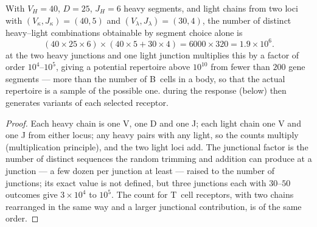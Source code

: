 \begin{theorem}\label{thm:b3:adaptive-immunity:repertoire}
With $V_{H} = 40$, $D = 25$, $J_{H} = 6$ heavy segments, and light chains
from two loci with $(V_{\kappa}, J_{\kappa}) = (40, 5)$ and
$(V_{\lambda}, J_{\lambda}) = (30, 4)$, the number of distinct
heavy--light combinations obtainable by segment choice alone is
\[
(40\times 25\times 6)\times(40\times 5 + 30\times 4) = 6000\times 320
= 1.9\times 10^{6}.
\]
 at the two heavy junctions and one light junction
multiplies this by a factor of order $10^{4}$--$10^{5}$, giving a
potential repertoire above $10^{10}$ from fewer than $200$ gene
segments --- more than the number of B~cells in a body, so that the
actual repertoire is a sample of the possible one.  during the response (below) then generates variants of
each selected receptor.
\end{theorem}
\begin{proof}
Each heavy chain is one V, one D and one J; each light chain one V and
one J from either locus; any heavy pairs with any light, so the counts
multiply (multiplication principle), and the two light loci add. The
junctional factor is the number of distinct sequences the random
trimming and addition can produce at a junction --- a few dozen per
junction at least --- raised to the number of junctions; its exact value
is not defined, but three junctions each with $30$--$50$ outcomes give
$3\times 10^{4}$ to $10^{5}$. The count for T~cell receptors, with two
chains rearranged in the same way and a larger junctional contribution,
is of the same order.
\end{proof}

